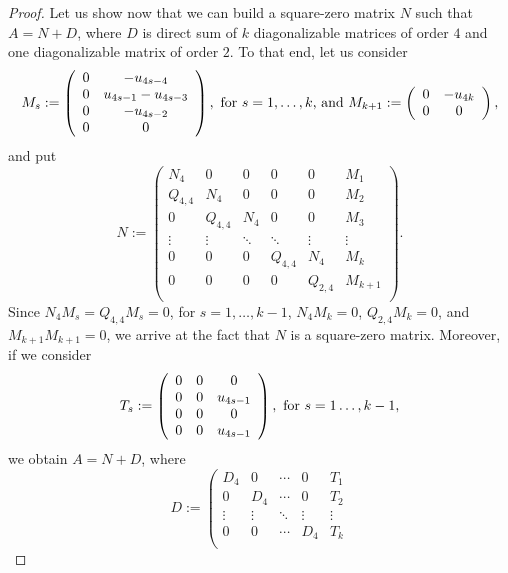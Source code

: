 \documentclass{amsart}
\theoremstyle{definition}
\theoremstyle{remark}
\numberwithin{equation}{section}
\begin{document}
\begin{proof}
Let us show now that we can build a square-zero matrix $N$ such that $A=N+D$, where $D$ is direct sum of $k$ diagonalizable matrices of order $4$ and one diagonalizable matrix of order $2$. To that end, let us consider
$$M_s:=\left(
   \begin{array}{cc}
      0 &-u_{4s-4}\\
      0 &  u_{4s-1}-u_{4s-3}\\
      0 & -u_{4s-2}\\
      0 &0\\
   \end{array}
 \right),\hbox{ for $s=1,\dots, k$, and} ~ M_{k+1}:=\left(
   \begin{array}{cc}
      0 &-u_{4k}\\
      0 &0\\
   \end{array}
 \right),$$
and put
$$N:=\left(
      \begin{array}{cccccc}
        N_4 & 0 & 0 &  0 & 0 & M_1 \\
        Q_{4,4} & N_4 & 0  & 0 & 0 & M_2 \\
        0 & Q_{4,4} & N_4  & 0 & 0 & M_3 \\
        \vdots & \vdots &  \ddots & \ddots & \vdots & \vdots \\
        0 & 0 & 0  & Q_{4,4} & N_4 & M_{k} \\
        0 & 0 & 0  & 0 & Q_{2,4} & M_{k+1} \\
      \end{array}
    \right).$$
Since  $N_4 M_s=Q_{4,4} M_s=0$, for $s=1,\dots, k-1$, $N_4M_k=0$, $Q_{2,4} M_k=0$, and $M_{k+1} M_{k+1}=0$, we arrive at the fact that $N$ is a square-zero matrix. Moreover, if we consider
$$T_s:=\left(
    \begin{array}{ccc}
       0 & 0 & 0 \\
       0 & 0 &  u_{4s-1} \\
       0 & 0 & 0   \\
       0 & 0 & u_{4s-1} \\
    \end{array}
  \right),\hbox{ for } s=1\dots, k-1,$$
we obtain $A=N+D$, where
$$D:=\left(
  \begin{array}{ccccc}
    D_4 & 0 & \cdots  & 0 & T_1 \\
    0 & D_4 & \cdots   & 0 & T_2 \\
    \vdots & \vdots & \ddots & \vdots &  \vdots \\
    0 & 0 & \cdots   & D_4 & T_k \\

\end{array}$$
\end{proof}
\end{document}
